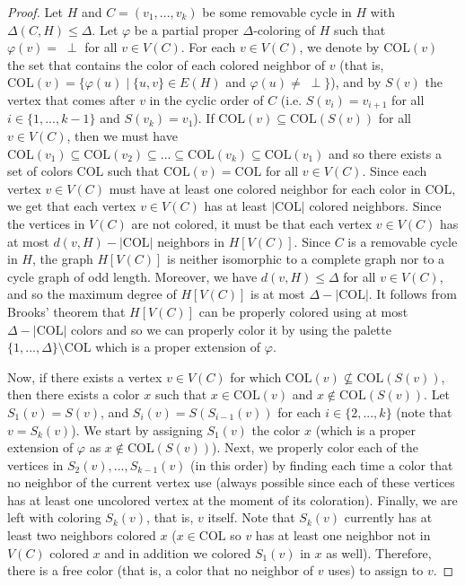 \documentclass{article}
\theoremstyle{definition}
\begin{document}
\begin{proof} Let $H$ and $C = (v_{1},...,v_{k})$ be some removable cycle in $H$ with $\Delta(C,H) \le \Delta$. Let $\varphi$ be a partial proper $\Delta$-coloring of $H$ such that $\varphi(v) = \; \perp$ for all $v \in V(C)$. For each $v \in V(C)$, we denote by $\text{COL}(v)$ the set that contains the color of each colored neighbor of $v$ (that is, $\text{COL}(v) = \{\varphi(u) \mid \{u,v\} \in E(H) $ and $\varphi(u) \ne \; \perp\}$), and by $S(v)$ the vertex that comes after $v$ in the cyclic order of $C$ (i.e. $S(v_i) = v_{i+1}$ for all $i \in \{1, ..., k-1\}$ and $S(v_k) = v_1$). If $\text{COL}(v) \subseteq \text{COL}(S(v))$ for all $v \in V(C)$, then we must have $\text{COL}(v_1) \subseteq \text{COL}(v_2) \subseteq ... \subseteq \text{COL}(v_k) \subseteq \text{COL}(v_1)$ and so there exists a set of colors $\text{COL}$ such that $\text{COL}(v) = \text{COL}$ for all $v \in V(C)$. Since each vertex $v \in V(C)$ must have at least one colored neighbor for each color in $\text{COL}$, we get that each vertex $v \in V(C)$ has at least $|\text{COL}|$ colored neighbors.
Since the vertices in $V(C)$ are not colored, it must be that each vertex $v \in V(C)$ has at most $d(v,H) - |\text{COL}|$ neighbors in $H[V(C)]$. Since $C$ is a removable cycle in $H$, the graph $H[V(C)]$ is neither isomorphic to a complete graph nor to a cycle graph of odd length. Moreover, we have $d(v,H) \le \Delta$ for all $v \in V(C)$, and so the maximum degree of $H[V(C)]$ is at most $\Delta - |\text{COL}|$. It follows from Brooks' theorem \cite{Brooks41} that $H[V(C)]$ can be properly colored using at most $\Delta - |\text{COL}|$ colors and so we can properly color it by using the palette $\{1,...,\Delta\}\setminus \text{COL}$ which is a proper extension of $\varphi$.

Now, if there exists a vertex $v \in V(C)$ for which $\text{COL}(v) \not\subseteq \text{COL}(S(v))$, then there exists a color $x$ such that $x \in \text{COL}(v)$ and $x \not\in\text{COL}(S(v))$. Let $S_1(v) = S(v)$, and $S_i(v) = S(S_{i-1}(v))$ for each $i \in \{2, ..., k\}$ (note that $v = S_k(v)$). We start by assigning $S_1(v)$ the color $x$ (which is a proper extension of $\varphi$ as $x \notin \text{COL}(S(v))$). Next, we properly color each of the vertices in $S_2(v), ..., S_{k-1}(v)$ (in this order) by finding each time a color that no neighbor of the current vertex use (always possible since each of these vertices has at least one uncolored vertex at the moment of its coloration).
Finally, we are left with coloring $S_{k}(v)$, that is, $v$ itself.
Note that $S_{k}(v)$ currently has at least two neighbors colored $x$ ($x\in \text{COL}$ so $v$ has at least one neighbor not in $V(C)$ colored $x$ and in addition we colored
 $S_1(v)$ in $x$ as well).
Therefore, there is a free color (that is, a color that no neighbor of $v$ uses) to assign to $v$.
 \end{proof}
\end{document}
